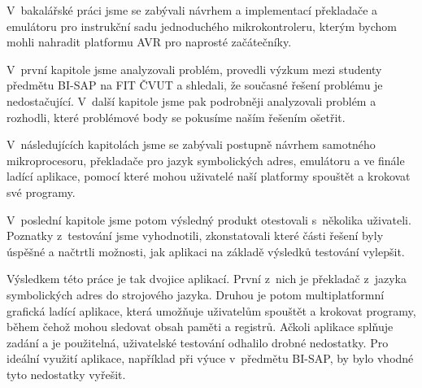 \begin{conclusion}

V~bakalářské práci jsme se zabývali návrhem a implementací překladače a emulátoru pro instrukční sadu jednoduchého mikrokontroleru, kterým bychom mohli nahradit platformu AVR pro naprosté začátečníky.

V~první kapitole jsme analyzovali problém, provedli výzkum mezi studenty předmětu BI-SAP na FIT ČVUT a shledali, že současné řešení problému je nedostačující. V~další kapitole jsme pak podrobněji analyzovali problém a rozhodli, které problémové body se pokusíme naším řešením ošetřit.

V~následujících kapitolách jsme se zabývali postupně návrhem samotného mikroprocesoru, překladače pro jazyk symbolických adres, emulátoru a ve finále ladící aplikace, pomocí které mohou uživatelé naší platformy spouštět a krokovat své programy.

V~poslední kapitole jsme potom výsledný produkt otestovali s~několika uživateli. Poznatky z~testování jsme vyhodnotili, zkonstatovali které části řešení byly úspěšné a načtrtli možnosti, jak aplikaci na základě výsledků testování vylepšit.

Výsledkem této práce je tak dvojice aplikací. První z~nich je překladač z~jazyka symbolických adres do strojového jazyka. Druhou je potom multiplatformní grafická ladící aplikace, která umožňuje uživatelům spouštět a krokovat programy, během čehož mohou sledovat obsah paměti a registrů. Ačkoli aplikace splňuje zadání a je použitelná, uživatelské testování odhalilo drobné nedostatky. Pro ideální využití aplikace, například při výuce v~předmětu BI-SAP, by bylo vhodné tyto nedostatky vyřešit.

\end{conclusion}
